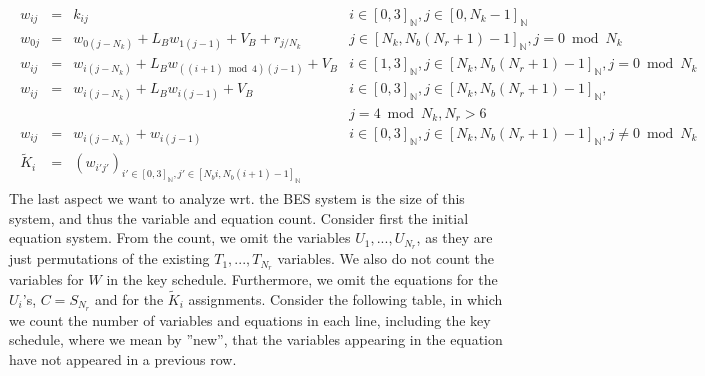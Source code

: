 \begin{align}
    \begin{array}{rcll}
        w_{ij} &=& k_{ij} & i \in [0, 3]_{\mathbb{N}}, j \in [0, N_k-1]_{\mathbb{N}}\\
        w_{0j} &=& w_{0(j-N_k)} + L_B w_{1(j-1)} + V_B + r_{j/N_k} & j \in [N_k, N_b(N_r+1)-1]_{\mathbb{N}}, j = 0 \bmod N_k\\
        w_{ij} &=& w_{i(j-N_k)} + L_B w_{((i+1) \bmod 4)(j-1)} + V_B & i \in [1, 3]_{\mathbb{N}}, j \in [N_k, N_b(N_r+1)-1]_{\mathbb{N}}, j = 0 \bmod N_k\\
        w_{ij} &=& w_{i(j-N_k)} + L_B w_{i(j-1)} +V_B & i \in [0, 3]_{\mathbb{N}}, j \in [N_k, N_b(N_r+1)-1]_{\mathbb{N}},\\
               & &                                    & j = 4 \bmod N_k, N_r > 6\\
        w_{ij} &=& w_{i(j-N_k)} + w_{i(j-1)} & i \in [0, 3]_{\mathbb{N}}, j \in [N_k, N_b(N_r+1)-1]_{\mathbb{N}}, j \neq 0 \bmod N_k\\
        \tilde{K}_i &=& (w_{i'j'})_{i' \in [0, 3]_{\mathbb{N}}, j' \in [N_bi, N_b(i+1)-1]_{\mathbb{N}}}
    \end{array}
\end{align}
The last aspect we want to analyze wrt. the BES system is the size of this system, and thus the variable and equation count. Consider first the initial equation system. From the count, we omit the variables \(U_1, ..., U_{N_r}\), as they are just permutations of the existing \(T_1, ..., T_{N_r}\) variables. We also do not count the variables for \(W\) in the key schedule. Furthermore, we omit the equations for the \(U_i\)'s, \(C = S_{N_r}\) and for the \(\tilde{K}_i\) assignments. Consider the following table, in which we count the number of variables and equations in each line, including the key schedule, where we mean by ''new'', that the variables appearing in the equation have not appeared in a previous row.
